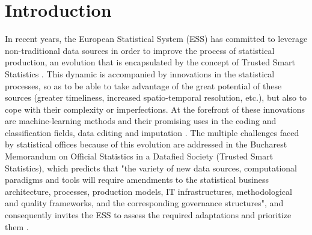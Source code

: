 \documentclass[graybox]{svmult}
\begin{document}




\section{Introduction}
\label{sec:introduction}

In recent years, the European Statistical System (ESS) has committed to leverage non-traditional data sources in order to improve the process of statistical production, an evolution that is encapsulated by the concept of Trusted Smart Statistics \citep{ricciato2019trusted}. This dynamic is accompanied by innovations in the statistical processes, so as to be able to take advantage of the great potential of these sources (greater timeliness, increased spatio-temporal resolution, etc.), but also to cope with their complexity or imperfections. At the forefront of these innovations are machine-learning methods and their promising uses in the coding and classification fields, data editing and imputation \citep{gjaltema2022high}. The multiple challenges faced by statistical offices because of this evolution are addressed in the Bucharest Memorandum on Official Statistics in a Datafied Society (Trusted Smart Statistics), which predicts that "the variety of new data sources, computational paradigms and tools will require amendments to the statistical business architecture, processes, production models, IT infrastructures, methodological and quality frameworks, and the corresponding governance structures", and consequently invites the ESS to assess the required adaptations and prioritize them \citep{bucharest2018}.
\end{document}
